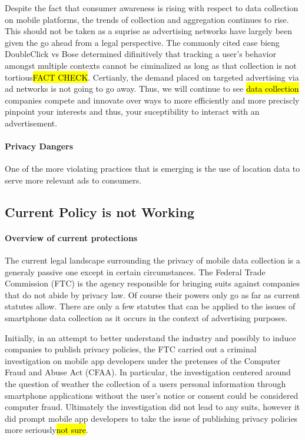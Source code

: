 Despite the fact that consumer awareness is rising with respect to data collection on mobile platforms, the trends of collection and aggregation continues to rise\cite{Source}. This should not be taken as a suprise as advertising networks have largely been given the go ahead from a legal perspective. The commonly cited case bieng DoubleClick vs Bose determined difinitively that tracking a user's behavior amongst multiple contexts cannot be ciminalized as long as that collection is not tortious\hl{FACT CHECK}. 
Certianly, the demand placed on targeted advertising via ad networks is not going to go away. Thus, we will continue to see \hl{data collection} companies compete and innovate over ways to more efficiently and more preciscly pinpoint your interests and thus, your suceptibility to interact with an advertisement. 


		\paragraph {Privacy Dangers}

One of the more violating practices that is emerging is the use of location data to serve more relevant ads to consumers. 

	\subsection{Current Policy is not Working}

		\paragraph{Overview of current protections}
The current legal landscape surrounding the privacy of mobile data collection is a generaly passive one except in certain circumstances. The Federal Trade Commission (FTC) is the agency responsible for bringing suits against companies that do not abide by privacy law. Of course their powers only go as far as current statutes allow. There are only a few statutes that can be applied to the issues of smartphone data collection as it occurs in the context of advertising purposes. 

Initially, in an attempt to better understand the industry\cite{wsj2011} and possibly to induce companies to publish privacy policies, the FTC carried out a criminal investigation on mobile app developers under the pretenses of the Computer Fraud and Abuse Act (CFAA). In particular, the investigation centered around the question of weather the collection of a users personal information through smartphone applications without the user's notice or consent could be considered computer fraud. Ultimately the investigation did not lead to any suits, however it did prompt mobile app developers to take the issue of publishing privacy policies more seriously\hl{not sure}. 

